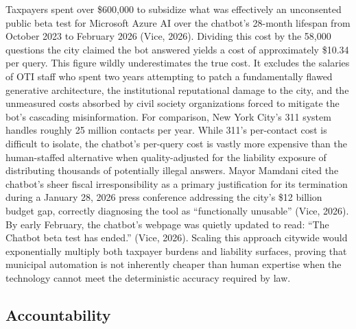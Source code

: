 \documentclass[10pt, twocolumn]{article}
\begin{document}
Taxpayers spent over \$600,000 to subsidize what was effectively an unconsented public beta test for Microsoft Azure AI over the chatbot's 28-month lifespan from October 2023 to February 2026 (Vice, 2026). Dividing this cost by the 58,000 questions the city claimed the bot answered yields a cost of approximately \$10.34 per query. This figure wildly underestimates the true cost. It excludes the salaries of OTI staff who spent two years attempting to patch a fundamentally flawed generative architecture, the institutional reputational damage to the city, and the unmeasured costs absorbed by civil society organizations forced to mitigate the bot's cascading misinformation. For comparison, New York City's 311 system handles roughly 25 million contacts per year. While 311's per-contact cost is difficult to isolate, the chatbot's per-query cost is vastly more expensive than the human-staffed alternative when quality-adjusted for the liability exposure of distributing thousands of potentially illegal answers. Mayor Mamdani cited the chatbot's sheer fiscal irresponsibility as a primary justification for its termination during a January 28, 2026 press conference addressing the city's \$12 billion budget gap, correctly diagnosing the tool as ``functionally unusable'' (Vice, 2026). By early February, the chatbot's webpage was quietly updated to read: ``The Chatbot beta test has ended.'' (Vice, 2026). Scaling this approach citywide would exponentially multiply both taxpayer burdens and liability surfaces, proving that municipal automation is not inherently cheaper than human expertise when the technology cannot meet the deterministic accuracy required by law.

\subsection*{Accountability}
\end{document}
